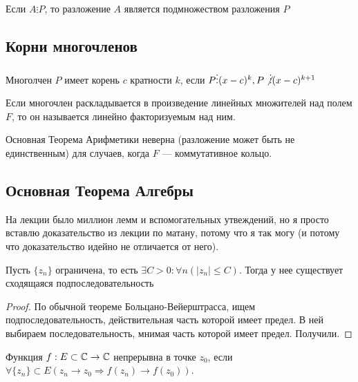 \begin{corollary}
    Если \(A \vdots P\), то разложение \(A\) является подмножеством разложения \(P\)
\end{corollary}

\subsection{Корни многочленов}

\begin{definition}
    Многолчен \(P\) имеет корень \(c\) кратности \(k\), если \(P\vdots (x-c)^k, P \not\vdots(x-c)^{k+1}\)
\end{definition}

\begin{definition}
    Если многочлен раскладывается в произведение линейных множителей над полем \(F\), то он называется линейно факторизуемым над ним.
\end{definition}

\begin{note}
    Основная Теорема Арифметики неверна (разложение может быть не единственным) для случаев, когда \(F\) --- коммутативное кольцо.
\end{note}

\subsection{Основная Теорема Алгебры}

На лекции было миллион лемм и вспомогательных утвеждений, но я просто вставлю доказательство из лекции по матану, потому что я так могу (и потому что доказательство идейно не отличается от него).

\begin{theorem}
    Пусть $\{z_n\}$ ограничена, то есть $\exists C > 0: \forall n (|z_n| \le C)$. Тогда у нее существует сходящаяся подпоследовательность
\end{theorem}
\begin{proof}
    По обычной теореме Больцано-Вейерштрасса, ищем подпоследовательность, действительная часть которой имеет предел. В ней выбираем последовательность, мнимая часть которой имеет предел. Получили.
\end{proof}

\begin{definition}
    Функция $f: E \subset \mathbb{C} \rightarrow \mathbb{C}$ непрерывна в точке $z_0$, если $\forall \{z_n\} \subset E (z_n \rightarrow z_0 \Rightarrow f(z_n) \rightarrow f(z_0))$.
\end{definition}

